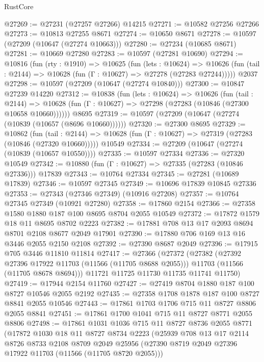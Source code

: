 \begin{lexlean}{RustCore}
\begin{coremodule}
@27269 := @27231 (@27257 @27266) @14215
@27271 := @10582 @27256 @27266
@27273 := @10813 @27255 @8671
@27274 := @10650 @8671
@27278 := @10597 (@27209 (@10647 (@27274 @10663)))
@27280 := @27234 (@10685 @8671)
@27281 := @10669 @27280
@27283 := @10597 (@27281 @10690)
@27294 := @10816
    (fun (rty : @1910) =>
    @10625
      (fun (lets : @10624) =>
      @10626 (fun (tail : @2144) => @10628 (fun (Γ : @10627) => @27278 (@27283 @27244)))))
    @2037
@27298 := @10597 (@27209 (@10647 (@27274 @10840)))
@27300 := @10847 @27239 @14220
@27312 := @10838
    (fun (lets : @10624) =>
    @10626
      (fun (tail : @2144) =>
      @10628 (fun (Γ : @10627) => @27298 (@27283 (@10846 (@27300 @10658 @10660))))))
    @8695
@27319 := @10597 (@27209 (@10647 (@27274 (@10839 (@10657 (@8696 @10660))))))
@27320 := @27300 @8695
@27329 := @10862
    (fun (tail : @2144) => @10628 (fun (Γ : @10627) => @27319 (@27283 (@10846 (@27320 @10660)))))
    @10549
@27334 := @27209 (@10647 (@27274 (@10839 (@10657 @10550))))
@27335 := @10597 @27334
@27336 := @27320 @10549
@27342 := @10880 (fun (Γ : @10627) => @27335 (@27283 (@10846 @27336))) @17839
@27343 := @10764 @27334
@27345 := @27281 (@10689 @17839)
@27346 := @10597 @27345
@27349 := @10696 @17839 @10845 @27336
@27353 := @27343 (@27346 @27349) (@10916 @27208)
@27357 := @10764 @27345 @27349 (@10921 @27280)
@27358 := @17860 @2154
@27366 := @27358 @1580 @1880 @187 @100 @8695 @8704 @2055 @10549
@27372 := @17872 @1579 @18 @11 @8695 @8702 @2223
@27382 := @17881 @708 @13 @17 @2093 @8694 @8701 @2108 @8677 @2049 @17901
@27390 := @17880 @706 @169 @13 @16 @3446 @2055 @2150 @2108
@27392 := @27390 @8687 @2049
@27396 := @17915 @705 @3446 @11810 @11814
@27417 := @27366
    (@27372
      (@27382
        (@27392 @27396 @17922 @11703 (@11566 (@11705 @8688 @2055)))
        @11703
        (@11566 (@11705 @8678 @8694)))
      @11721
      @11725
      @11730
      @11735
      @11741
      @11750)
@27419 := @17944 @2154 @11760
@27427 := @27419 @8704 @1880 @187 @100 @8727 @10546 @2055 @2192
@27435 := @27358 @1708 @1878 @187 @100 @8727 @8841 @2055 @10546
@27443 := @17861 @1703 @1706 @715 @11 @8727 @8806 @2055 @8841
@27451 := @17861 @1700 @1041 @715 @11 @8727 @8771 @2055 @8806
@27498 := @17861
    @1031
    @1036
    @715
    @11
    @8727
    @8736
    @2055
    @8771
    (@17872
      @1030
      @18
      @11
      @8727
      @8734
      @2223
      (@25939
        @708
        @13
        @17
        @2114
        @8726
        @8733
        @2108
        @8709
        @2049
        @25956
        (@27390 @8719 @2049 @27396 @17922 @11703 (@11566 (@11705 @8720 @2055)))

\end{coremodule}
\end{lexlean}
